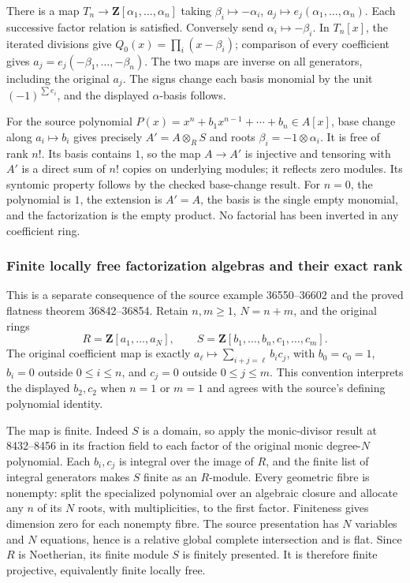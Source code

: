 There is a map \(T_n\to\mathbf Z[\alpha_1,\ldots,\alpha_n]\) taking \(\beta_i\mapsto-\alpha_i\), \(a_j\mapsto e_j(\alpha_1,\ldots,\alpha_n)\). Each successive factor relation is satisfied. Conversely send \(\alpha_i\mapsto-\beta_i\). In \(T_n[x]\), the iterated divisions give \(Q_0(x)=\prod_i(x-\beta_i)\); comparison of every coefficient gives \(a_j=e_j(-\beta_1,\ldots,-\beta_n)\). The two maps are inverse on all generators, including the original \(a_j\). The signs change each basis monomial by the unit \((-1)^{\sum e_i}\), and the displayed \(\alpha\)-basis follows.

For the source polynomial \(P(x)=x^n+b_1x^{n-1}+\cdots+b_n\in A[x]\), base change along \(a_i\mapsto b_i\) gives precisely \(A'=A\otimes_R S\) and roots \(\beta_i=-1\otimes\alpha_i\). It is free of rank \(n!\). Its basis contains \(1\), so the map \(A\to A'\) is injective and tensoring with \(A'\) is a direct sum of \(n!\) copies on underlying modules; it reflects zero modules. Its syntomic property follows by the checked base-change result. For \(n=0\), the polynomial is \(1\), the extension is \(A'=A\), the basis is the single empty monomial, and the factorization is the empty product. No factorial has been inverted in any coefficient ring.

\subsubsection{Finite locally free factorization algebras and their exact rank}\label{algebra-proof-046-finite-locally-free-factorization-algebras-and-their-exact-rank}

This is a separate consequence of the source example 36550--36602 and the proved flatness theorem 36842--36854. Retain \(n,m\ge1\), \(N=n+m\), and the original rings \[
R=\mathbf Z[a_1,\ldots,a_N],\qquad
S=\mathbf Z[b_1,\ldots,b_n,c_1,\ldots,c_m].
\] The original coefficient map is exactly \(a_\ell\mapsto\sum_{i+j=\ell}b_i c_j\), with \(b_0=c_0=1\), \(b_i=0\) outside \(0\le i\le n\), and \(c_j=0\) outside \(0\le j\le m\). This convention interprets the displayed \(b_2,c_2\) when \(n=1\) or \(m=1\) and agrees with the source's defining polynomial identity.

The map is finite. Indeed \(S\) is a domain, so apply the monic-divisor result at 8432--8456 in its fraction field to each factor of the original monic degree-\(N\) polynomial. Each \(b_i,c_j\) is integral over the image of \(R\), and the finite list of integral generators makes \(S\) finite as an \(R\)-module. Every geometric fibre is nonempty: split the specialized polynomial over an algebraic closure and allocate any \(n\) of its \(N\) roots, with multiplicities, to the first factor. Finiteness gives dimension zero for each nonempty fibre. The source presentation has \(N\) variables and \(N\) equations, hence is a relative global complete intersection and is flat. Since \(R\) is Noetherian, its finite module \(S\) is finitely presented. It is therefore finite projective, equivalently finite locally free.

